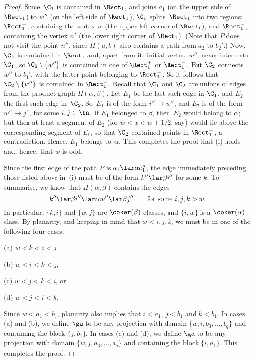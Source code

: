 \begin{proof}
Since~$\C_1$ is contained in $\Rect_1$, and joins $a_1$ (on the upper side of $\Rect_1$) to $w''$ (on the left side of $\Rect_1$), $\C_1$ splits~$\Rect_1$ into two regions: $\Rect_1^+$, containing the vertex $w$ (the upper left corner of $\Rect_1$), and $\Rect_1^-$, containing the vertex $n'$ (the lower right corner of $\Rect_1$).  (Note that $P$ does not visit the point $n''$, since $\Pi(a,b)$ also contains a path from $a_2$ to $b_2'$.)  Now, $\C_2$ is contained in $\Rect_1$ and, apart from its initial vertex~$w''$, never intersects~$\C_1$, so $\C_2\setminus\{w''\}$ is contained in one of $\Rect_1^+$ or $\Rect_1^-$.  But $\C_2$ connects $w''$ to $b_1'$, with the latter point belonging to $\Rect_1^-$.  So it follows that $\C_2\setminus\{w''\}$ is contained in $\Rect_1^-$.
%
Recall that $\C_1$ and $\C_2$ are unions of edges from the product graph $\Pi(\alpha,\beta)$.  Let $E_1$ be the last such edge in $\C_1$, and $E_2$ the first such edge in~$\C_2$.  So~$E_1$ is of the form $i''\to w''$, and $E_2$ is of the form $w''\to j''$, for some $i,j\in\bn$.  If $E_1$ belonged to $\beta$, then~$E_2$ would belong to $\alpha$; but then at least a segment of $E_2$ (for $w<x<w+1/2$, say) would lie above the corresponding segment of $E_1$, so that $\C_2$ contained points in $\Rect_1^+$, a contradiction.  Hence, $E_1$ belongs to~$\alpha$.  This completes the proof that (i) holds and, hence, that $w$ is odd.

Since the first edge of the path $P$ is $a_1\lar\alpha a_1''$, the edge immediately preceding those listed above in~(i) must be of the form $k''\lar\beta i''$ for some $k$.  To summarise, we know that $\Pi(\alpha,\beta)$ contains the edges
\[
k''\lar\beta i''\lar\alpha w''\lar\beta j'' \qquad\text{for some $i,j,k>w$.}
\]
In particular, $\{k,i\}$ and $\{w,j\}$ are $\coker(\beta)$-classes, and $\{i,w\}$ is a $\coker(\alpha)$-class.  By planarity, and keeping in mind that $w<i,j,k$, we must be in one of the following four cases:
\begin{itemize}\begin{multicols}{4}
\item[(a)] $w<k<i<j$,
\item[(b)] $w<i<k<j$,
\item[(c)] $w<j<k<i$, or
\item[(d)] $w<j<i<k$.
\end{multicols}\end{itemize}
Since $w<a_1<b_1$, planarity also implies that $i<a_1$, $j<b_1$ and $k<b_1$.  In cases (a) and (b), we define $\ga$ to be any projection with domain $\{w,i,b_3,\ldots,b_q\}$ and containing the block $\{j,b_1\}$.  In cases (c) and (d), we define $\ga$ to be any projection with domain $\{w,j,a_3,\ldots,a_q\}$ and containing the block $\{i,a_1\}$.  This completes the proof. \end{proof}





